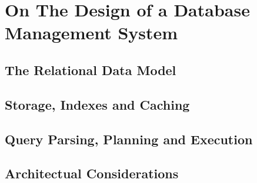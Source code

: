 \chapter{On The Design of a Database Management System}
\label{chapter:theory_databases}


\section{The Relational Data Model}

\section{Storage, Indexes and Caching}

\section{Query Parsing, Planning and Execution}

\section{Architectual Considerations}